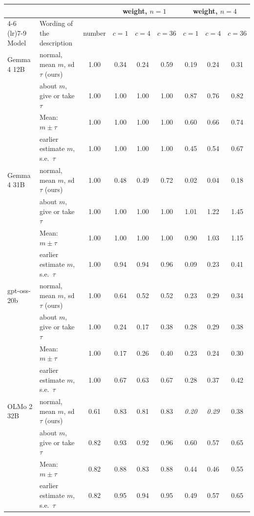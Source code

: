 \begin{tabular}{llccccccc}
\toprule
& & & \multicolumn{3}{c}{weight, $n = 1$} & \multicolumn{3}{c}{weight, $n = 4$} \\
\cmidrule(lr){4-6} \cmidrule(lr){7-9}
Model & Wording of the description & number & $c = 1$ & $c = 4$ & $c = 36$ & $c = 1$ & $c = 4$ & $c = 36$ \\
\midrule
Gemma 4 12B & normal, mean $m$, sd $\tau$ (ours) & 1.00 & 0.34 & 0.24 & 0.59 & 0.19 & 0.24 & 0.31 \\
 & about $m$, give or take $\tau$ & 1.00 & 1.00 & 1.00 & 1.00 & 0.87 & 0.76 & 0.82 \\
 & Mean: $m \pm \tau$ & 1.00 & 1.00 & 1.00 & 1.00 & 0.60 & 0.66 & 0.74 \\
 & earlier estimate $m$, s.e.\ $\tau$ & 1.00 & 1.00 & 1.00 & 1.00 & 0.45 & 0.54 & 0.67 \\
\midrule
Gemma 4 31B & normal, mean $m$, sd $\tau$ (ours) & 1.00 & 0.48 & 0.49 & 0.72 & 0.02 & 0.04 & 0.18 \\
 & about $m$, give or take $\tau$ & 1.00 & 1.00 & 1.00 & 1.00 & 1.01 & 1.22 & 1.45 \\
 & Mean: $m \pm \tau$ & 1.00 & 1.00 & 1.00 & 1.00 & 0.90 & 1.03 & 1.15 \\
 & earlier estimate $m$, s.e.\ $\tau$ & 1.00 & 0.94 & 0.94 & 0.96 & 0.09 & 0.23 & 0.41 \\
\midrule
gpt-oss-20b & normal, mean $m$, sd $\tau$ (ours) & 1.00 & 0.64 & 0.52 & 0.52 & 0.23 & 0.29 & 0.34 \\
 & about $m$, give or take $\tau$ & 1.00 & 0.24 & 0.17 & 0.38 & 0.28 & 0.29 & 0.38 \\
 & Mean: $m \pm \tau$ & 1.00 & 0.17 & 0.26 & 0.40 & 0.23 & 0.24 & 0.30 \\
 & earlier estimate $m$, s.e.\ $\tau$ & 1.00 & 0.67 & 0.63 & 0.67 & 0.28 & 0.37 & 0.42 \\
\midrule
OLMo 2 32B & normal, mean $m$, sd $\tau$ (ours) & 0.61 & 0.83 & 0.81 & 0.83 & \textit{0.20} & \textit{0.29} & 0.38 \\
 & about $m$, give or take $\tau$ & 0.82 & 0.93 & 0.92 & 0.96 & 0.60 & 0.57 & 0.65 \\
 & Mean: $m \pm \tau$ & 0.82 & 0.88 & 0.83 & 0.88 & 0.44 & 0.46 & 0.55 \\
 & earlier estimate $m$, s.e.\ $\tau$ & 0.82 & 0.95 & 0.94 & 0.95 & 0.49 & 0.57 & 0.65 \\
\midrule

\end{tabular}
